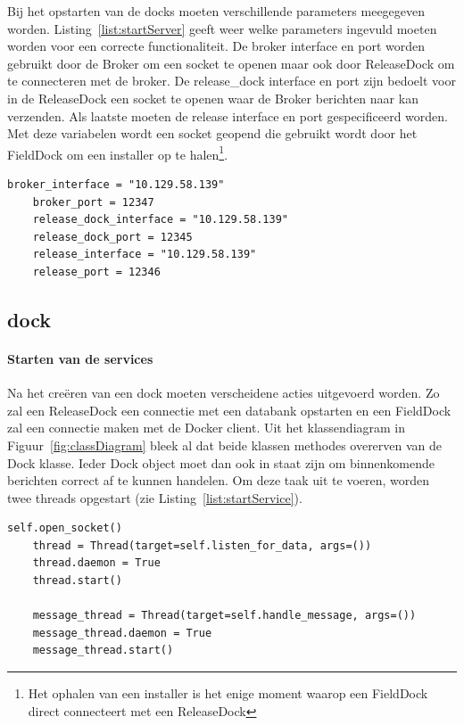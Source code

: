 Bij het opstarten van de docks moeten verschillende parameters meegegeven worden.
Listing~\ref{list:startServer} geeft weer welke parameters ingevuld moeten worden voor een correcte functionaliteit.
De broker interface en port worden gebruikt door de Broker om een socket te openen maar ook door ReleaseDock om te connecteren met de broker.
De release\_dock interface en port zijn bedoelt voor in de ReleaseDock een socket te openen waar de Broker berichten naar kan verzenden.
Als laatste moeten de release interface en port gespecificeerd worden.
Met deze variabelen wordt een socket geopend die gebruikt wordt door het FieldDock om een installer op te halen\footnote{Het ophalen van een installer is het enige moment waarop een FieldDock direct connecteert met een ReleaseDock}.			

\begin{minipage}{\linewidth}
\begin{center}
\begin{lstlisting}[caption={Parameters voor server en broker},label={list:startServer}]
    broker_interface = "10.129.58.139"
    broker_port = 12347
    release_dock_interface = "10.129.58.139"
    release_dock_port = 12345
    release_interface = "10.129.58.139"
    release_port = 12346
\end{lstlisting}
\end{center}
\end{minipage}

\subsection{dock}
\paragraph{Starten van de services} %
Na het creëren van een dock moeten verscheidene acties uitgevoerd worden.
Zo zal een ReleaseDock een connectie met een databank opstarten en een FieldDock zal een connectie maken met de Docker client.
Uit het klassendiagram in Figuur~\vref{fig:classDiagram} bleek al dat beide klassen methodes overerven van de Dock klasse.
Ieder Dock object moet dan ook in staat zijn om binnenkomende berichten correct af te kunnen handelen.
Om deze taak uit te voeren, worden twee threads opgestart (zie Listing~\vref{list:startService}).

\begin{minipage}{\linewidth}
\begin{center}
\begin{lstlisting}[caption={Starten van dock services},label={list:startService}]
    self.open_socket()
    thread = Thread(target=self.listen_for_data, args=())
    thread.daemon = True
    thread.start()

    message_thread = Thread(target=self.handle_message, args=())
    message_thread.daemon = True
    message_thread.start()
\end{lstlisting}
\end{center}
\end{minipage}

